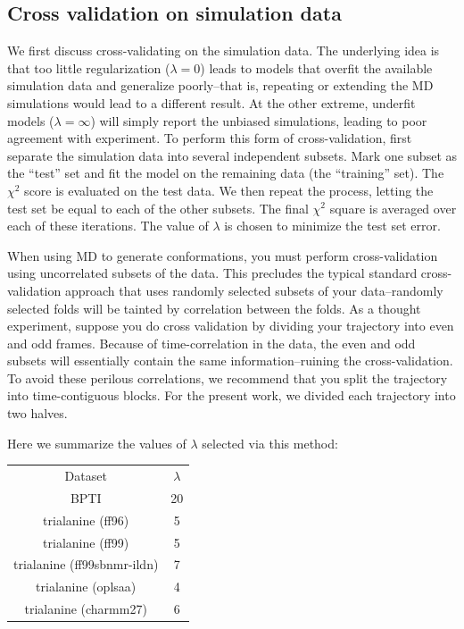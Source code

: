 \documentclass[journal=jacsat,manuscript=article]{achemso}
\begin{document}
\subsection{Cross validation on simulation data}

We first discuss cross-validating on the simulation data.  The underlying idea is that too little regularization ($\lambda = 0$) leads to models that overfit the available simulation data and generalize poorly--that is, repeating or extending the MD simulations would lead to a different result.  At the other extreme, underfit models ($\lambda = \infty$) will simply report the unbiased simulations, leading to poor agreement with experiment.  To perform this form of cross-validation, first separate the simulation data into several independent subsets.  Mark one subset as the ``test'' set and fit the model on the remaining data (the ``training'' set).  The $\chi^2$ score is evaluated on the test data.  We then repeat the process, letting the test set be equal to each of the other subsets.  The final $\chi^2$ square is averaged over each of these iterations.  The value of $\lambda$ is chosen to minimize the test set error.

When using MD to generate conformations, you must perform cross-validation using uncorrelated subsets of the data.  This precludes the typical standard cross-validation approach that uses randomly selected subsets of your data--randomly selected folds will be tainted by correlation between the folds.  As a thought experiment, suppose you do cross validation by dividing your trajectory into even and odd frames.  Because of time-correlation in the data, the even and odd subsets will essentially contain the same information--ruining the cross-validation.  To avoid these perilous correlations, we recommend that you split the trajectory into time-contiguous blocks.  For the present work, we divided each trajectory into two halves.  

Here we summarize the values of $\lambda$ selected via this method:

\begin{table}
\begin{tabular}{c|c}
Dataset                   & $\lambda$  \\
BPTI                      & 20 \\
trialanine (ff96)               & 5 \\
trialanine (ff99)               & 5 \\ 
trialanine (ff99sbnmr-ildn)     & 7 \\ 
trialanine (oplsaa)             & 4 \\ 
trialanine (charmm27)           & 6 \\

\end{tabular} 
\end{table}
\end{document}
